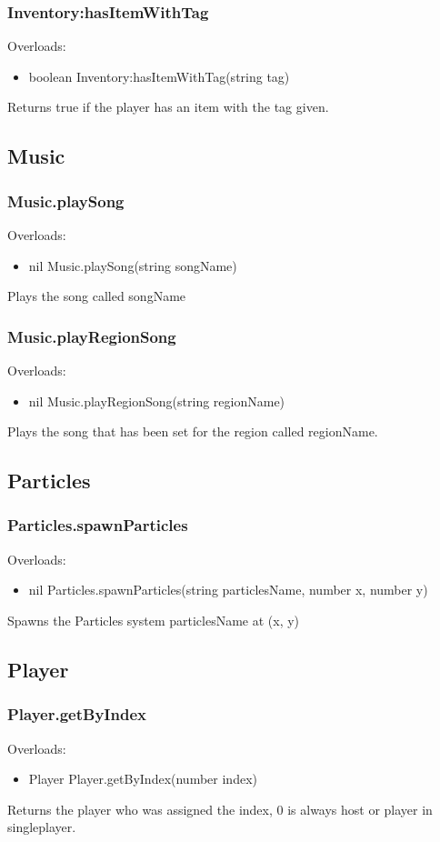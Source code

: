 \documentclass{book}
\newenvironment{ulist}
	{\begin{itemize}
			\itemsep0em}
	{\end{itemize}}
\begin{document}
\subsubsection{Inventory:hasItemWithTag}
Overloads:
\begin{ulist}
	\item boolean Inventory:hasItemWithTag(string tag)
\end{ulist}
Returns true if the player has an item with the tag given.

\subsection{Music}
\subsubsection{Music.playSong}
Overloads:
\begin{ulist}
	\item nil Music.playSong(string songName)
\end{ulist}
Plays the song called songName

\subsubsection{Music.playRegionSong}
Overloads:
\begin{ulist}
	\item nil Music.playRegionSong(string regionName)
\end{ulist}
Plays the song that has been set for the region called regionName.


\subsection{Particles}
\subsubsection{Particles.spawnParticles}
Overloads:
\begin{ulist}
	\item nil Particles.spawnParticles(string particlesName, number x, number y)
\end{ulist}
Spawns the Particles system particlesName at (x, y)

\subsection{Player}
\subsubsection{Player.getByIndex}
Overloads:
\begin{ulist}
	\item Player Player.getByIndex(number index)
\end{ulist}
Returns the player who was assigned the index, 0 is always host or player in singleplayer.
\end{document}
